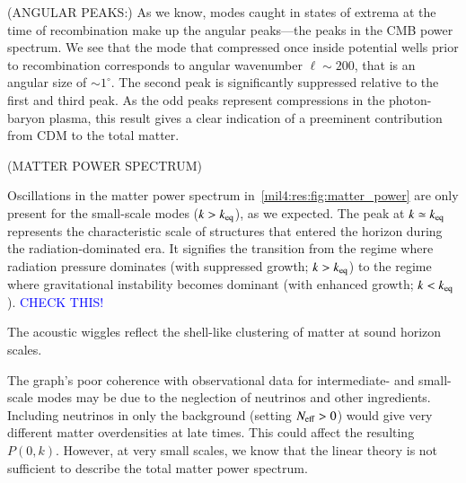 (ANGULAR PEAKS:) As we know, modes caught in states of extrema at the time of recombination make up the angular peaks---the peaks in the CMB power spectrum. We see that the mode that compressed once inside potential wells prior to recombination corresponds to angular wavenumber $\ell\sim 200$, that is an angular size of $\sim 1^\circ$. The second peak is significantly suppressed relative to the first and third peak. As the odd peaks represent compressions in the photon-baryon plasma, this result gives a clear indication of a preeminent contribution from CDM to the total matter.  



(MATTER POWER SPECTRUM)

Oscillations in the matter power spectrum in~\cref{mil4:res:fig:matter_power} are only present for the small-scale modes ($k>k_\mathrm{eq}$), as we expected. The peak at $k\simeq k_\mathrm{eq}$ represents the characteristic scale of structures that entered the horizon during the radiation-dominated era. It signifies the transition from the regime where radiation pressure dominates (with suppressed growth; $k>k_\mathrm{eq}$) to the regime where gravitational instability becomes dominant (with enhanced growth; $k<k_\mathrm{eq}$). \textcolor{blue}{CHECK THIS!} 

The acoustic wiggles reflect the shell-like clustering of matter at sound horizon scales. 

The graph's poor coherence with observational data for intermediate- and small-scale modes may be due to the neglection of neutrinos and other ingredients. Including neutrinos in only the background (setting $N_\mathrm{eff}> 0$) would give very different matter overdensities at late times. This could affect the resulting $P(0,k)$. However, at very small scales, we know that the linear theory is not sufficient to describe the total matter power spectrum.
